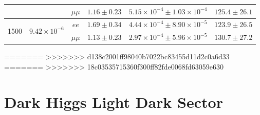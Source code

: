 \documentclass[12pt, a4paper]{book}
\begin{document}
\begin{table}[!ht]
\begin{tabular}{@{}ccc|ccc@{}}
         & & $\mu\mu$ & $1.16\pm0.23$ & $5.15\times10^{-4}\pm1.03\times10^{-4}$ & $125.4\pm26.1$ \\ \midrule
         \multirow{2}{*}[-2\baselineskip]{1500}& \multirow{2}{*}[-2\baselineskip]{$9.42\times10^{-6}$}& $ee$ & $1.69\pm0.34$ & $4.44\times10^{-4}\pm8.90\times10^{-5}$ & $123.9\pm26.5$ \\ 
         & & $\mu\mu$ & $1.13\pm0.23$ & $2.97\times10^{-4}\pm5.96\times10^{-5}$ & $130.7\pm27.2$ \\
      \midrule\midrule
   \end{tabular}
   \label{tab:stat_vals_DH_HDS}
\end{table} 

=======
>>>>>>> d138c2001ff98040b7022bc83455d11d2c0a6d33
=======
>>>>>>> 18c03535715360f300ff82fde0068fd63059e630
\section{Dark Higgs Light Dark Sector}
\end{document}
